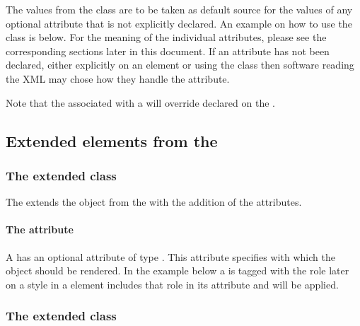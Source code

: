 The values from the \DefaultValues class are to be taken as 
default source for the values of any optional attribute that is not explicitly declared. An example on how to use the \DefaultValues 
class is below. For the meaning of the individual attributes, please see the 
corresponding sections later in this document. If an attribute has not been declared, either explicitly on an element or using the \DefaultValues class then software reading the XML may chose how they handle the attribute.

Note that the \DefaultValues associated with a \ListOfLocalRenderInformation will override \DefaultValues declared on the \ListOfGlobalRenderInformation.
\pagebreak
{}


\subsection{Extended elements from the \LayoutPackage}


\subsubsection{The extended  class}
\label{graphicalobject-class}

The \RenderPackage extends the  object from the \LayoutPackage with the
addition of
the  attributes.

\paragraph{The \fixttspace{} attribute}


A \GraphicalObject has an optional attribute  of type
.  This attribute specifies with which \Style the object should be rendered. 
In the example below a \SpeciesGlyph is tagged with the role 
later on a style in a \GlobalRenderInformation element includes that role in its 
 attribute and will be applied.



\subsubsection{The extended  class}
\label{listoflayouts-class}


